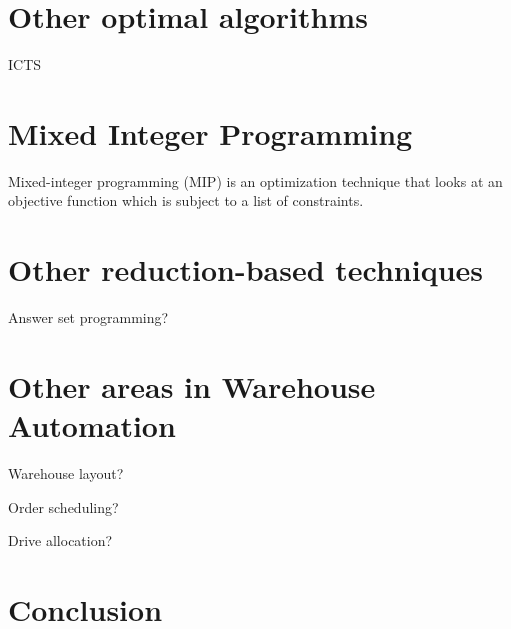 \documentclass[a4paper,11pt]{article}
\begin{document}
\section{Other optimal algorithms}
ICTS

\section{Mixed Integer Programming}
Mixed-integer programming (MIP) is an optimization technique that looks at an objective function which is subject to a list of constraints.


\section{Other reduction-based techniques}
Answer set programming?

\section{Other areas in Warehouse Automation}
Warehouse layout?

Order scheduling?

Drive allocation?

\section{Conclusion}




	
\end{document}
